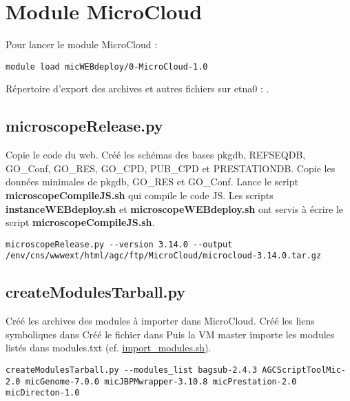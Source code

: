 \section {Module MicroCloud}

Pour lancer le module MicroCloud :
\begin{lstlisting}[style=bash]
module load micWEBdeploy/0-MicroCloud-1.0
\end{lstlisting}

Répertoire d'export des archives et autres fichiers sur etna0 : .

\subsection{microscopeRelease.py}
Copie le code du web.
\newline
Créé les schémas des bases pkgdb, REFSEQDB, GO\_Conf, GO\_RES, GO\_CPD, PUB\_CPD et PRESTATIONDB.
\newline
Copie les données minimales de pkgdb, GO\_RES et GO\_Conf.
\newline
Lance le script \textbf{microscopeCompileJS.sh} qui compile le code JS. Les scripts \textbf{instanceWEBdeploy.sh} et \textbf{microscopeWEBdeploy.sh} ont servis à écrire le script \textbf{microscopeCompileJS.sh}.

\begin{lstlisting}[style=bash]
microscopeRelease.py --version 3.14.0 --output /env/cns/wwwext/html/agc/ftp/MicroCloud/microcloud-3.14.0.tar.gz
\end{lstlisting}

\subsection{createModulesTarball.py}
Créé les archives des modules à importer dans MicroCloud.
\newline
Créé les liens symboliques dans 
\newline
Créé le fichier  dans 
\newline
Puis la VM master importe les modules listés dans modules.txt (cf. \href{https://github.com/IFB-ElixirFr/biosphere-microcloud/blob/master/master/import_modules.sh}{import\_modules.sh}).

\begin{lstlisting}[style=bash]
createModulesTarball.py --modules_list bagsub-2.4.3 AGCScriptToolMic-2.0 micGenome-7.0.0 micJBPMwrapper-3.10.8 micPrestation-2.0 micDirecton-1.0
\end{lstlisting}

